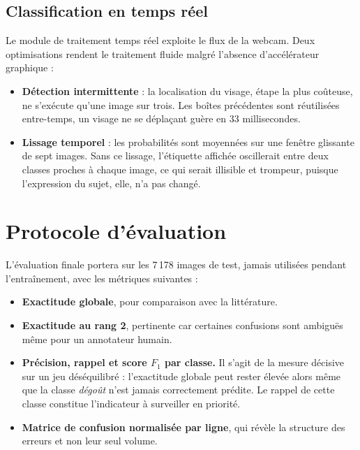 \documentclass[a4paper,12pt]{report}
\begin{document}
\subsection{Classification en temps réel}

Le module de traitement temps réel exploite le flux de la webcam. Deux
optimisations rendent le traitement fluide malgré l'absence d'accélérateur
graphique :

\begin{itemize}[leftmargin=*,itemsep=2pt]
  \item \textbf{Détection intermittente} : la localisation du visage, étape la
        plus coûteuse, ne s'exécute qu'une image sur trois. Les boîtes
        précédentes sont réutilisées entre-temps, un visage ne se déplaçant
        guère en 33 millisecondes.
  \item \textbf{Lissage temporel} : les probabilités sont moyennées sur une
        fenêtre glissante de sept images. Sans ce lissage, l'étiquette affichée
        oscillerait entre deux classes proches à chaque image, ce qui serait
        illisible et trompeur, puisque l'expression du sujet, elle, n'a pas
        changé.
\end{itemize}

\section{Protocole d'évaluation}

L'évaluation finale portera sur les 7\,178 images de test, jamais utilisées
pendant l'entraînement, avec les métriques suivantes :

\begin{itemize}[leftmargin=*,itemsep=2pt]
  \item \textbf{Exactitude globale}, pour comparaison avec la littérature.
  \item \textbf{Exactitude au rang 2}, pertinente car certaines confusions sont
        ambiguës même pour un annotateur humain.
  \item \textbf{Précision, rappel et score $F_1$ par classe.} Il s'agit de la
        mesure décisive sur un jeu déséquilibré : l'exactitude globale peut
        rester élevée alors même que la classe \emph{dégoût} n'est jamais
        correctement prédite. Le rappel de cette classe constitue l'indicateur à
        surveiller en priorité.
  \item \textbf{Matrice de confusion normalisée par ligne}, qui révèle la
        structure des erreurs et non leur seul volume.
\end{itemize}
\end{document}

